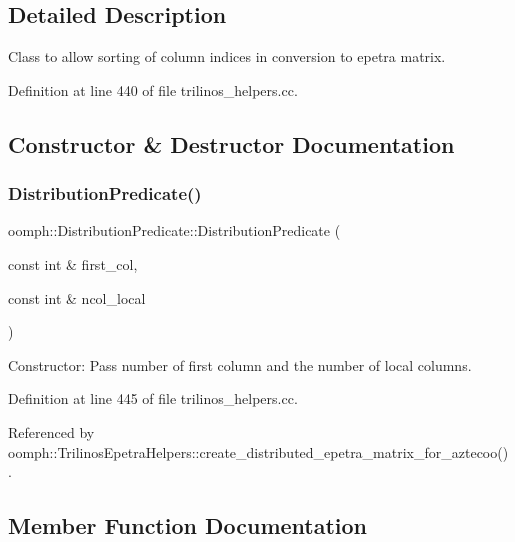 \subsection{Detailed Description}
Class to allow sorting of column indices in conversion to epetra matrix. 

Definition at line 440 of file trilinos\+\_\+helpers.\+cc.



\subsection{Constructor \& Destructor Documentation}
\mbox{\label{classoomph_1_1DistributionPredicate_a6eed861d5dca10c4118de4857705fd92}} 
\subsubsection{\texorpdfstring{Distribution\+Predicate()}{DistributionPredicate()}}
{\footnotesize\ttfamily oomph\+::\+Distribution\+Predicate\+::\+Distribution\+Predicate (\begin{DoxyParamCaption}\item[{const int \&}]{first\+\_\+col,  }\item[{const int \&}]{ncol\+\_\+local }\end{DoxyParamCaption})\hspace{0.3cm}{\ttfamily [inline]}}



Constructor\+: Pass number of first column and the number of local columns. 



Definition at line 445 of file trilinos\+\_\+helpers.\+cc.



Referenced by oomph\+::\+Trilinos\+Epetra\+Helpers\+::create\+\_\+distributed\+\_\+epetra\+\_\+matrix\+\_\+for\+\_\+aztecoo().



\subsection{Member Function Documentation}
\mbox{\label{classoomph_1_1DistributionPredicate_a701adea6dabe769c65afc647b655f39f}} 
